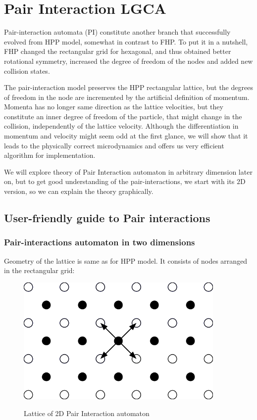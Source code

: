 \chapter{Pair Interaction LGCA}
Pair-interaction automata (PI) constitute another branch that successfully evolved from HPP model, somewhat in contrast to FHP.
To put it in a nutshell, FHP changed the rectangular grid for hexagonal, and thus obtained better rotational symmetry, increased the degree of freedom of the nodes and added new collision states. 

The pair-interaction model preserves the HPP rectangular lattice, but the degrees of freedom in the node are incremented by the artificial definition of momentum.
Momenta has no longer same direction as the lattice velocities, but they constitute an inner degree of freedom of the particle, that might change in the collision, independently of the lattice velocity.
Although the differentiation in momentum and velocity might seem odd at the first glance, we will show that it leads to the physically correct microdynamics and offers us very efficient algorithm for implementation.

\bigskip
We will explore theory of Pair Interaction automaton in arbitrary dimension later on, but to get good understanding of the pair-interactions, we start with its $2$D version, so we can explain the theory graphically.

\section{User-friendly guide to Pair interactions}

\subsection{Pair-interactions automaton in two dimensions}

Geometry of the lattice is same as for HPP model. It consists of nodes arranged in the rectangular grid:

\begin{figure}[htbp]
 \centering 
 \includegraphics[width=0.9\textwidth]{./img/pi_grid}
 \label{2dgrid}
 \caption{Lattice of 2D Pair Interaction automaton}
\end{figure}

